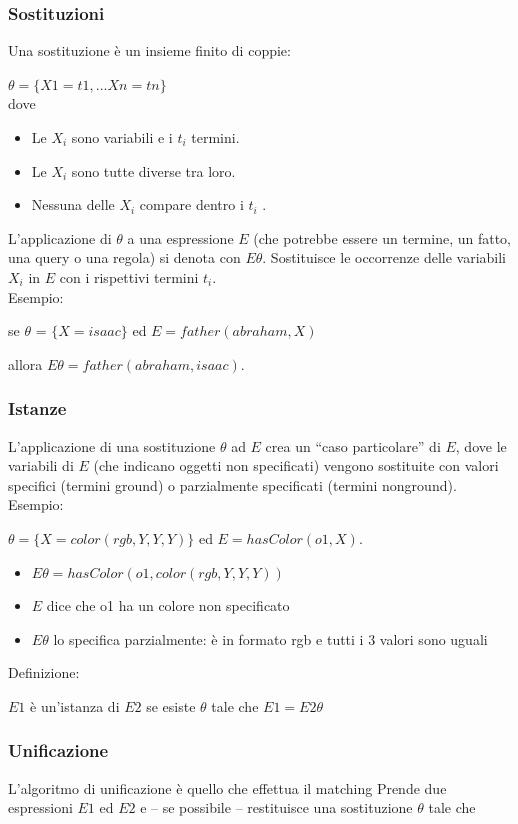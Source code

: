 \documentclass[10pt]{article}
\begin{document}
\subsubsection{Sostituzioni}
Una sostituzione è un insieme finito di coppie:

$\theta = \{X1 = t1 , . . . Xn = tn \}$
\\
dove
\begin{itemize}
    \item Le $X_i$ sono variabili e i $t_i$ termini.
    \item Le $X_i$ sono tutte diverse tra loro.
    \item Nessuna delle $X_i$ compare dentro i $t_i$ .
\end{itemize}
L’applicazione di $\theta$ a una espressione $E$ (che potrebbe essere un
termine, un fatto, una query o una regola) si denota con $E\theta$.
Sostituisce le occorrenze delle variabili $X_i$ in $E$ con i rispettivi
termini $t_i$.
\\
Esempio:

se $\theta$ = $\{X = isaac\}$ ed $E = father(abraham, X)$ 

allora $E\theta = father(abraham, isaac)$.

\subsubsection{Istanze}
L’applicazione di una sostituzione $\theta$ ad $E$ crea un “caso particolare” di $E$,
dove le variabili di $E$ (che indicano oggetti non specificati)
vengono sostituite con valori specifici (termini ground)
o parzialmente specificati (termini nonground).
\\
Esempio: 

$\theta = \{X = color(rgb, Y, Y, Y)\}$ ed $E = hasColor(o1, X).$

\begin{itemize}
    \item $E\theta = hasColor(o1, color(rgb, Y, Y, Y))$
    \item $E$ dice che o1 ha un colore non specificato
    \item $E\theta$ lo specifica parzialmente: è in formato rgb e tutti i 3
valori sono uguali
\end{itemize}
Definizione:

$E1$ è un’istanza di $E2$ se esiste $ \theta$ tale che $E1 = E2\theta$
\subsubsection{Unificazione}
L’algoritmo di unificazione è quello che effettua il matching
Prende due espressioni $E1$ ed $E2$ e – se possibile – restituisce una
sostituzione $\theta$ tale che
\end{document}
